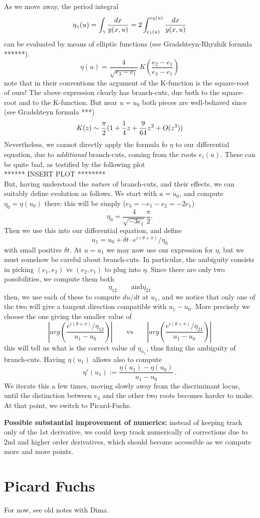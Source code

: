\documentclass[11pt]{article}
\newcommand{\be}{\begin{equation}}
\newcommand{\ee}{\end{equation}}
\begin{document}
As we move away, the period integral
\be
	\eta_{\gamma}(u) = \int_{\gamma} {dx\over y(x,u)} = 2 \int_{e_{1}(u)}^{e_{2}(u)}{dx\over y(x,u)}
\ee
can be evaluated by means of elliptic functions (see Gradshteyn-Rhyzhik formula ******).
\be
	\eta(u) = \frac{4}{\sqrt{e_{3}-e_{1}}} \, K\left( \frac{e_{2}-e_{1}}{e_{3}-e_{1}} \right)
\ee
note that in their conventions the argument of the K-function is the square-root of ours!
The above expression clearly has branch-cuts, due both to the square-root and to the K-function.
But near $u=u_{0}$ both pieces are well-behaved since (see Gradshteyn formula ***)
\be
	K(z) \sim {\pi\over 2}(1+ {1\over 4}z + {9\over 64} z^{2} +O(z^{3}))
\ee
Nevertheless, we cannot directly apply the formula fo $\eta$ to our differential equation, due to \emph{additional} branch-cuts, coming from the roots $e_{i}(u)$. These can be quite bad, as testified by the following plot \\
****** INSERT PLOT ********\\
But, having understood the \emph{nature} of branch-cuts, and their effects, we can suitably define evolution as follows.
We start with $u=u_{0}$, and compute $\eta_{0} = \eta(u_{0})$ there: this will be simply ($e_{3} = -e_{1}-e_{2} = -2e_{1}$)
\be
	\eta_{0} = \frac{4}{\sqrt{-3 e_{1}}}\frac{\pi}{2}.
\ee
Then we use this into our differential equation, and define
\be
	u_{1} = u_{0} + \delta t \cdot  e^{i(\theta +\pi)} / \eta_{0}
\ee
with small positive $\delta t$.
At $u=u_{1}$ we may now use our expression for $\eta$, but we must somehow be careful about branch-cuts. In particular, the ambiguity consists in picking $(e_{1}, e_{2})$ vs $(e_{2}, e_{1})$ to plug into $\eta$. Since there are only two possibilities, we compute them both
\be
	\eta_{12} \qquad \text{and} \eta_{21}
\ee
then, we use each of these to compute $du/dt$ at $u_{1}$, and we notice that only one of the two will give a tangent direction compatible with $u_{1}-u_{0}$. More precisely we choose the one giving the smaller value of
\be
	\left|arg\left(  \frac{e^{i(\theta +\pi)} / \eta_{12}}{u_{1}-u_{0}} \right) \right| %
	\qquad \text{vs} \qquad %
	\left|arg\left(  \frac{e^{i(\theta +\pi)} / \eta_{21}}{u_{1}-u_{0}} \right) \right|
\ee
this will tell us what is the correct value of $\eta_{u_{1}}$, thus fixing the ambiguity of branch-cuts.
Having $\eta(u_{1})$ allows also to compute 
\be
	\eta'(u_{1}) := \frac{\eta(u_{1}) - \eta(u_{0})}{u_{1}-u_{0}}\,.
\ee
We iterate this a few times, moving slowly away from the discriminant locus, until the distinction between $e_{3}$ and the other two roots becomes harder to make. At that point, we switch to Picard-Fuchs.

\bigskip

{\bf Possible substantial improvement of numerics:} instead of keeping track only of the 1st derivative, we could keep track numerically of corrections due to 2nd and higher order derivatives,
which should become accessible as we compute more and more points.


\section{Picard Fuchs}
For now, see old notes with Dima.
\end{document}
